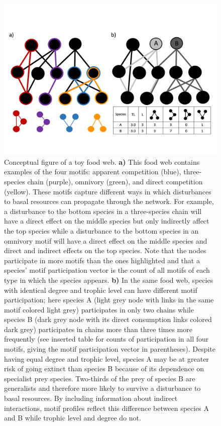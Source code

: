 \documentclass[12pt]{article}
\begin{document}
\begin{spacing}{2.0}
        \begin{figure}[hb!]
        \centering
        \includegraphics[width=.9\textwidth]{manuscript/figures/Figure_1.png}
        \caption{Conceptual figure of a toy food web. \textbf{a)} This food web contains examples of the four motifs: apparent competition (blue), three-species chain (purple), omnivory (green), and direct competition (yellow). These motifs capture different ways in which disturbances to basal resources can propagate through the network. For example, a disturbance to the bottom species in a three-species chain will have a direct effect on the middle species but only indirectly affect the top species while a disturbance to the bottom species in an omnivory motif will have a direct effect on the middle species and direct and indirect effects on the top species. 
        Note that the nodes participate in more motifs than the ones highlighted and that a species' motif participation vector is the count of all motifs of each type in which the species appears. \textbf{b)} In the same food web, species with identical degree and trophic level can have different motif participation; here species A (light grey node with links in the same motif colored light grey) participates in only two chains while species B (dark grey node with its direct consumption links colored dark grey) participates in chains more than three times more frequently (see inserted table for counts of participation in all four motifs, giving the motif participation vector in parentheses). 
        Despite having equal degree and trophic level, species A may be at greater risk of going extinct than species B because of its dependence on specialist prey species. Two-thirds of the prey of species B are generalists and therefore more likely to survive a disturbance to basal resources. By including information about indirect interactions, motif profiles reflect this difference between species A and B while trophic level and degree do not.}
    \label{fig:concept}
    \end{figure}


\end{spacing}
\end{document}

